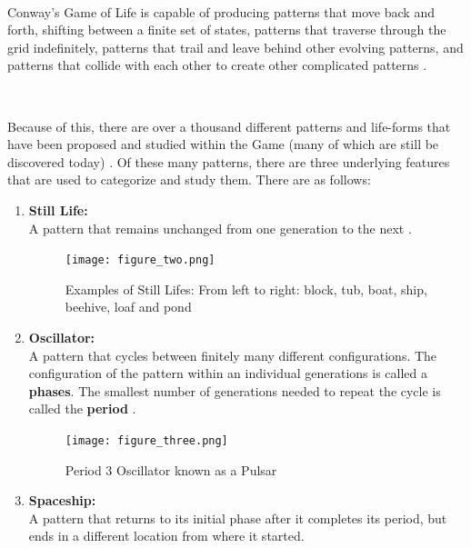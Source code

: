\documentclass{article}
\theoremstyle{definition}
\theoremstyle{plain}
\theoremstyle{plain}
\begin{document}
\

Conway's Game of Life is capable of producing patterns that move back and forth, shifting between a finite set of states, patterns that traverse through the grid indefinitely, patterns that trail and leave behind other evolving patterns, and patterns that collide with each other to create other complicated patterns \cite{JG2022conway}.

\

Because of this, there are over a thousand different patterns and life-forms that have been proposed and studied within the Game (many of which are still be discovered today) \cite{Life_Wiki}. Of these many patterns, there are three underlying features that are used to categorize and study them. There are as follows: 

\begin{enumerate}
  \item \textbf{Still Life: } \\ A pattern that remains unchanged from one generation to the next \cite{JG2022conway}.

 \begin{figure}[ht]
          \centering
    \texttt{[image: figure\_two.png]}
    \label{stil_lifes}
    \caption{Examples of Still Lifes: From left to right: block, tub, boat, ship, beehive, loaf and pond}
    \cite{JG2022conway}
\end{figure}


  \item \textbf{Oscillator: } \\ A pattern that cycles between finitely many different configurations. The configuration of the pattern within an individual generations is called a \textbf{phases}. The smallest number of generations needed to repeat the cycle is called the \textbf{period} \cite{JG2022conway}.



 \begin{figure}[ht]
          \centering
    \texttt{[image: figure\_three.png]}
    \caption{Period 3 Oscillator known as a Pulsar}
    \cite{JG2022conway}
\end{figure}




\label{spaceship_def}
  \item \textbf{Spaceship: } \\ A pattern that returns to its initial phase after it completes its period, but ends in a different location from where it started. \cite{JG2022conway}
\end{enumerate}
\end{document}
